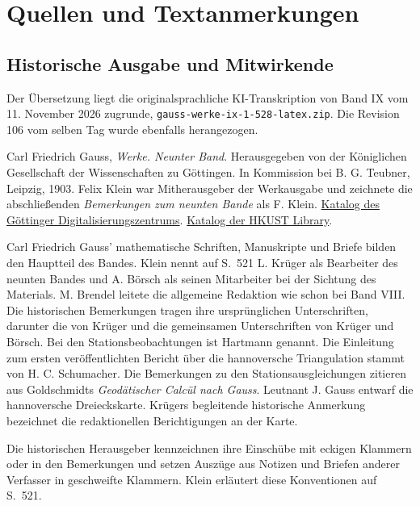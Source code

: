\clearpage
\hypertarget{gaussix-sources}{}
\section*{Quellen und Textanmerkungen}

\subsection*{Historische Ausgabe und Mitwirkende}

Der Übersetzung liegt die originalsprachliche KI-Transkription von Band IX vom 11. November 2026 zugrunde, \texttt{gauss-werke-ix-1-528-latex.zip}. Die Revision 106 vom selben Tag wurde ebenfalls herangezogen.

\noindent Carl Friedrich Gauss, \textit{Werke. Neunter Band}. Herausgegeben von der Königlichen Gesellschaft der Wissenschaften zu Göttingen. In Kommission bei B. G. Teubner, Leipzig, 1903. Felix Klein war Mitherausgeber der Werkausgabe und zeichnete die abschließenden \textit{Bemerkungen zum neunten Bande} als F. Klein. \href{https://gdz.sub.uni-goettingen.de/id/PPN23601515X}{Katalog des Göttinger Digitalisierungszentrums}. \href{https://lbezone.hkust.edu.hk/rse/?p=13258}{Katalog der HKUST Library}.

Carl Friedrich Gauss’ mathematische Schriften, Manuskripte und Briefe bilden den Hauptteil des Bandes. Klein nennt auf S.~521 L. Krüger als Bearbeiter des neunten Bandes und A. Börsch als seinen Mitarbeiter bei der Sichtung des Materials. M. Brendel leitete die allgemeine Redaktion wie schon bei Band VIII. Die historischen Bemerkungen tragen ihre ursprünglichen Unterschriften, darunter die von Krüger und die gemeinsamen Unterschriften von Krüger und Börsch. Bei den Stationsbeobachtungen ist Hartmann genannt. Die Einleitung zum ersten veröffentlichten Bericht über die hannoversche Triangulation stammt von H. C. Schumacher. Die Bemerkungen zu den Stationsausgleichungen zitieren aus Goldschmidts \textit{Geodätischer Calcül nach Gauss}. Leutnant J. Gauss entwarf die hannoversche Dreieckskarte. Krügers begleitende historische Anmerkung bezeichnet die redaktionellen Berichtigungen an der Karte.

Die historischen Herausgeber kennzeichnen ihre Einschübe mit eckigen Klammern oder in den Bemerkungen und setzen Auszüge aus Notizen und Briefen anderer Verfasser in geschweifte Klammern. Klein erläutert diese Konventionen auf S.~521.

